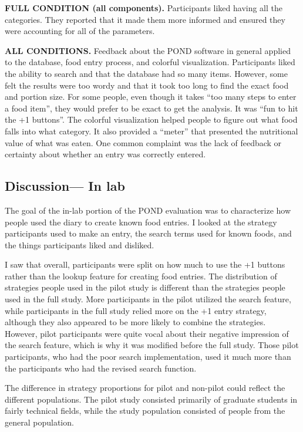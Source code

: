 \textbf{FULL CONDITION (all components).}
Participants liked having all the categories. They reported that it made them more informed and ensured they were accounting for all of the parameters. 

\textbf{ALL CONDITIONS.}
Feedback about the POND software in general applied to the database, food entry process, and colorful visualization. Participants liked the ability to search and that the database had so many items. However, some felt the results were too wordy and that it took too long to find the exact food and portion size. For some people, even though it takes ``too many steps to enter a food item'', they would prefer to be exact to get the analysis. It was ``fun to hit the +1 buttons''. The colorful visualization helped people to figure out what food falls into what category. It also provided a ``meter'' that presented the nutritional value of what was eaten. One common complaint was the lack of feedback or certainty about whether an entry was correctly entered. 


\subsection{Discussion--- In lab}

The goal of the in-lab portion of the POND evaluation was to characterize how people used the diary to create known food entries. I looked at the strategy participants used to make an entry, the search terms used for known foods, and the things participants liked and disliked. 

I saw that overall, participants were split on how much to use the +1 buttons rather than the lookup feature for creating food entries. The distribution of strategies people used in the pilot study is different than the strategies people used in the full study. More participants in the pilot utilized the search feature, while participants in the full study relied more on the +1 entry strategy, although they also appeared to be more likely to combine the strategies. However, pilot participants were quite vocal about their negative impression of the search feature, which is why it was modified before the full study. Those pilot participants, who had the poor search implementation, used it much more than the participants who had the revised search function. 

The difference in strategy proportions for pilot and non-pilot could reflect the different populations. The pilot study consisted primarily of graduate students in fairly technical fields, while the study population consisted of people from the general population. 

